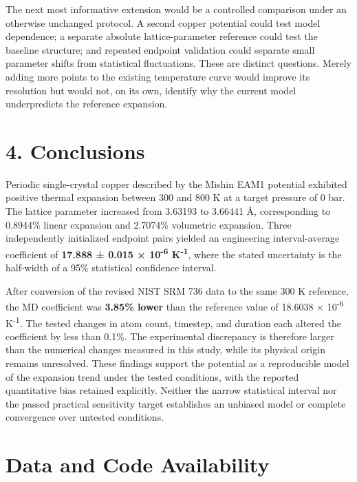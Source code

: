 \documentclass[10pt,a4paper,twocolumn]{article}
\begin{document}
The next most informative extension would be a controlled comparison under an otherwise unchanged protocol. A second copper potential could test model dependence; a separate absolute lattice-parameter reference could test the baseline structure; and repeated endpoint validation could separate small parameter shifts from statistical fluctuations. These are distinct questions. Merely adding more points to the existing temperature curve would improve its resolution but would not, on its own, identify why the current model underpredicts the reference expansion.


\section*{4. Conclusions}

Periodic single-crystal copper described by the Mishin EAM1 potential exhibited positive thermal expansion between 300 and 800 K at a target pressure of 0 bar. The lattice parameter increased from 3.63193 to 3.66441 Å, corresponding to 0.8944\% linear expansion and 2.7074\% volumetric expansion. Three independently initialized endpoint pairs yielded an engineering interval-average coefficient of \textbf{17.888 ± 0.015 × 10\textsuperscript{-6} K\textsuperscript{-1}}, where the stated uncertainty is the half-width of a 95\% statistical confidence interval.


After conversion of the revised NIST SRM 736 data to the same 300 K reference, the MD coefficient was \textbf{3.85\% lower} than the reference value of 18.6038 × 10\textsuperscript{-6} K\textsuperscript{-1}. The tested changes in atom count, timestep, and duration each altered the coefficient by less than 0.1\%. The experimental discrepancy is therefore larger than the numerical changes measured in this study, while its physical origin remains unresolved. These findings support the potential as a reproducible model of the expansion trend under the tested conditions, with the reported quantitative bias retained explicitly. Neither the narrow statistical interval nor the passed practical sensitivity target establishes an unbiased model or complete convergence over untested conditions.


\section*{Data and Code Availability}
\end{document}
